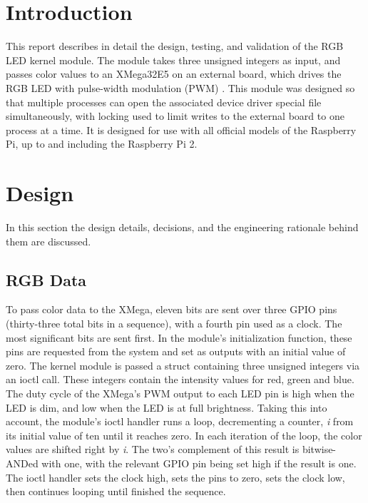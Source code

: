 \documentclass[10pt]{article}
\begin{document}
\Large{}

\large
\section{Introduction}

\noindent This report describes in detail the design, testing, and validation of the RGB LED kernel module. The module takes three unsigned integers as input, and passes color values to an XMega32E5 on an external board, which drives the RGB LED with pulse-width modulation (PWM) . This module was designed so that multiple processes can open the associated device driver special file simultaneously, with locking used to limit writes to the external board to one process at a time. It is designed for use with all official models of the Raspberry Pi, up to and including the Raspberry Pi 2. 


\section{Design}
In this section the design details, decisions, and the engineering rationale behind them are discussed.
\subsection{RGB Data}
\noindent To pass color data to the XMega, eleven bits are sent over three GPIO pins (thirty-three total bits in a sequence), with a fourth pin used as a clock. The most significant bits are sent first. In the module's initialization function, these pins are requested from the system and set as outputs with an initial value of zero. The kernel module is passed a struct containing three unsigned integers via an ioctl call. These integers contain the intensity values for red, green and blue. The duty cycle of the XMega's PWM output to each LED pin is high when the LED is dim, and low when the LED is at full brightness. Taking this into account, the module's ioctl handler runs a loop, decrementing a counter, \emph{i} from its initial value of ten until it reaches zero. In each iteration of the loop, the color values are shifted right by \emph{i}. The two's complement of this result is bitwise-ANDed with one, with the relevant GPIO pin being set high if the result is one. The ioctl handler sets the clock high, sets the pins to zero, sets the clock low, then continues looping until finished the sequence.
\end{document}
